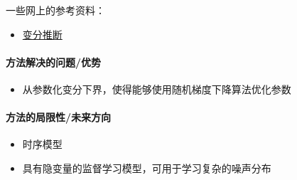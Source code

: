 一些网上的参考资料：
\begin{itemize}
	\item \href{https://www.cnblogs.com/yifdu25/p/8181185.html}{变分推断}
\end{itemize}

\paragraph{方法解决的问题/优势}

\begin{itemize}
	\item 从参数化变分下界，使得能够使用随机梯度下降算法优化参数

\end{itemize}


\paragraph{方法的局限性/未来方向}

\begin{itemize}
	\item 时序模型
	\item 具有隐变量的监督学习模型，可用于学习复杂的噪声分布

\end{itemize}






